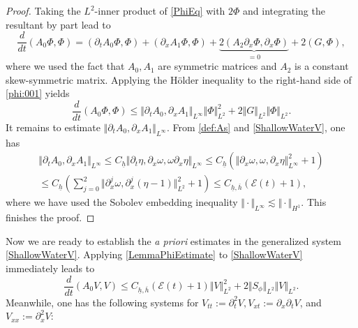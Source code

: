 \documentclass[reqno,11pt]{amsart}
\newcommand{\norm}[2]{\Vert #1 \Vert_{#2}}
\theoremstyle{plain}
\theoremstyle{definition}
\numberwithin{equation}{section}
\begin{document}
\begin{proof}
    Taking the $ L^2 $-inner product of \eqref{PhiEq} with $ 2 \Phi $ and integrating the resultant by part lead to 
    \begin{equation}
        \label{phi:001}
        \dfrac{d}{dt} (A_0 \Phi, \Phi) =  (\partial_t A_0 \Phi, \Phi) + (\partial_x A_1 \Phi, \Phi) + \underbrace{2(A_2 \partial_x \Phi, \partial_x \Phi)}_{=0} + 2 (G,\Phi),
    \end{equation}
    where we used the fact that $ A_0, A_1 $ are symmetric matrices and $ A_2 $ is a constant skew-symmetric matrix. Applying the Hölder inequality to the right-hand side of \eqref{phi:001} yields
    \begin{equation}
    \label{phi:002}
        \dfrac{d}{dt}(A_0 \Phi, \Phi) \leq \norm{\partial_t A_0, \partial_x A_1}{L^\infty}\norm{\Phi}{L^2}^2 + 2 \norm{G}{L^2} \norm{\Phi}{L^2}. 
    \end{equation}
    It remains to estimate $ \norm{\partial_t A_0, \partial_x A_1}{L^\infty} $. From \eqref{def:As} and \eqref{ShallowWaterV}, one has
    \begin{equation}
        \label{phi:003}
        \begin{gathered}
        \norm{\partial_t A_0, \partial_x A_1}{L^\infty} \leq C_{\underline h} \norm{\partial_t \eta, \partial_x \omega, \omega \partial_x \eta}{L^\infty} \leq C_{\underline h} (\norm{\partial_x \omega, \omega,\partial_x \eta}{L^\infty}^2 + 1) \\
        \leq C_{\underline h} (\sum_{j=0}^2 \norm{\partial_x^j \omega, \partial_x^j (\eta-1)}{L^2}^2 + 1) \leq C_{\underline h, \overline h} (\mathcal E(t) + 1),
        \end{gathered}
    \end{equation}
    where we have used the Sobolev embedding inequality $ \norm{\cdot}{L^\infty} \lesssim \norm{\cdot }{H^1} $. 
    This finishes the proof. 
\end{proof}
Now we are ready to establish the {\it a priori} estimates in the generalized system \eqref{ShallowWaterV}. Applying \eqref{LemmaPhiEstimate} to \eqref{ShallowWaterV} immediately leads to 
\begin{equation}
    \label{basic:energy}
    \dfrac{d}{dt}(A_0V,V) \leq C_{\underline h,\overline h} (\mathcal E(t) + 1) \norm{V}{L^2}^2 + 2 \norm{S_\phi}{L^2} \norm{V}{L^2}.
\end{equation}
Meanwhile, one has the following systems for $ V_{tt} := \partial_{t}^2 V, V_{xt} := \partial_x\partial_{t} V $, and $ V_{xx} := \partial_{x}^2 V $:
\end{document}

